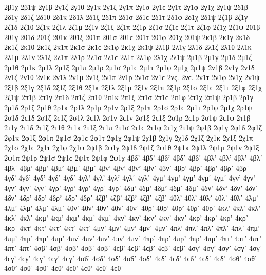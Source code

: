 {2β1χ 
2β1ψ 
%
2γ1β 
2γ1ζ 
2γ1θ 
2γ1κ 
2γ1ξ 
2γ1π 
2γ1σ 2γ1ϲ 
2γ1τ 
2γ1φ 
2γ1χ 
2γ1ψ 
%
2δ1β 
2δ1γ 
2δ1ζ 
2δ1θ 
2δ1κ 
2δ1λ 
2δ1ξ 
2δ1π 
2δ1σ 2δ1ϲ 
2δ1τ 
2δ1φ 
2δ1χ 
2δ1ψ 
%
2ζ1β   %
2ζ1γ 
2ζ1δ 
2ζ1θ 
2ζ1κ 
2ζ1λ 
2ζ1μ 
2ζ1ν 
2ζ1ξ 
2ζ1π 
2ζ1ρ 
2ζ1σ 2ζ1ϲ 
2ζ1τ 
2ζ1φ 
2ζ1χ 
2ζ1ψ 
%
2θ1β 
2θ1γ 
2θ1δ 
2θ1ζ 
2θ1κ 
2θ1ξ 
2θ1π 
2θ1σ 2θ1ϲ 
2θ1τ 
2θ1φ 
2θ1χ 
2θ1ψ 
%
2κ1β 
2κ1γ 
2κ1δ 
2κ1ζ 
2κ1θ 
2κ1ξ 
2κ1π 
2κ1σ 2κ1ϲ 
2κ1φ 
2κ1χ 
2κ1ψ 
%
2λ1β 
2λ1γ 
2λ1δ 
2λ1ζ 
2λ1θ 
2λ1κ 
2λ1μ 
2λ1ν 
2λ1ξ 
2λ1π 
2λ1ρ 
2λ1σ 2λ1ϲ 
2λ1τ 
2λ1φ 
2λ1χ 
2λ1ψ 
%
2μ1β 
2μ1γ 
2μ1δ 
2μ1ζ 
2μ1θ 
2μ1κ 
2μ1λ 
2μ1ξ 
2μ1π 
2μ1ρ 
2μ1σ 2μ1ϲ 
2μ1τ 
2μ1φ 
2μ1χ 
2μ1ψ 
%
2ν1β 
2ν1γ 
2ν1δ 
2ν1ζ 
2ν1θ 
2ν1κ 
2ν1λ 
2ν1μ 
2ν1ξ 
2ν1π 
2ν1ρ 
2ν1σ 2ν1ϲ 
2νς. 2νϲ. 
2ν1τ 
2ν1φ 
2ν1χ 
2ν1ψ 
%
2ξ1β 
2ξ1γ 
2ξ1δ 
2ξ1ζ 
2ξ1θ 
2ξ1κ 
2ξ1λ 
2ξ1μ 
2ξ1ν 
2ξ1π 
2ξ1ρ 
2ξ1σ 2ξ1ϲ 
2ξ1τ 
2ξ1φ 
2ξ1χ 
2ξ1ψ 
%
2π1β 
2π1γ 
2π1δ 
2π1ζ 
2π1θ 
2π1κ 
2π1ξ 
2π1σ 2π1ϲ 
2π1φ 
2π1χ 
2π1ψ 
%
2ρ1β 
2ρ1γ 
2ρ1δ 
2ρ1ζ 
2ρ1θ 
2ρ1κ 
2ρ1λ 
2ρ1μ 
2ρ1ν 
2ρ1ξ 
2ρ1π 
2ρ1σ 2ρ1ϲ 
2ρ1τ 
2ρ1φ 
2ρ1χ 
2ρ1ψ 
%
2σ1δ 2ϲ1δ   %
2σ1ζ 2ϲ1ζ 
2σ1λ 2ϲ1λ 
2σ1ν 2ϲ1ν 
2σ1ξ 2ϲ1ξ 
2σ1ρ 2ϲ1ρ 
2σ1ψ 2ϲ1ψ 
%
2τ1β 
2τ1γ 
2τ1δ 
2τ1ζ 
2τ1θ 
2τ1κ 
2τ1ξ 
2τ1π 
2τ1σ 2τ1ϲ 
2τ1φ 
2τ1χ 
2τ1ψ 
%
2φ1β 
2φ1γ 
2φ1δ 
2φ1ζ 
2φ1κ 
2φ1ξ 
2φ1π 
2φ1σ 2φ1ϲ 
2φ1τ 
2φ1χ 
2φ1ψ 
%
2χ1β 
2χ1γ 
2χ1δ 
2χ1ζ 
2χ1κ 
2χ1ξ 
2χ1π 
2χ1σ 2χ1ϲ 
2χ1τ 
2χ1φ 
2χ1ψ 
%
2ψ1β 
2ψ1γ 
2ψ1δ 
2ψ1ζ 
2ψ1θ 
2ψ1κ 
2ψ1λ 
2ψ1μ 
2ψ1ν 
2ψ1ξ 
2ψ1π 
2ψ1ρ 
2ψ1σ 2ψ1ϲ 
2ψ1τ 
2ψ1φ 
2ψ1χ 
4βδ' 4βδ’ 4βδʼ 4βδ᾽ 4βδ᾿ 
4βλ' 4βλ’ 4βλʼ 4βλ᾽ 4βλ᾿ 
4βμ' 4βμ’ 4βμʼ 4βμ᾽ 4βμ᾿ 
4βν' 4βν’ 4βνʼ 4βν᾽ 4βν᾿ 
4βρ' 4βρ’ 4βρʼ 4βρ᾽ 4βρ᾿ 
%
4γδ' 4γδ’ 4γδʼ 4γδ᾽ 4γδ᾿ 
4γλ' 4γλ’ 4γλʼ 4γλ᾽ 4γλ᾿ 
4γμ' 4γμ’ 4γμʼ 4γμ᾽ 4γμ᾿ 
4γν' 4γν’ 4γνʼ 4γν᾽ 4γν᾿ 
4γρ' 4γρ’ 4γρʼ 4γρ᾽ 4γρ᾿ 
%
4δμ' 4δμ’ 4δμʼ 4δμ᾽ 4δμ᾿ 
4δν' 4δν’ 4δνʼ 4δν᾽ 4δν᾿ 
4δρ' 4δρ’ 4δρʼ 4δρ᾽ 4δρ᾿ 
%
4ζβ' 4ζβ’ 4ζβʼ 4ζβ᾽ 4ζβ᾿ 
%
4θλ' 4θλ’ 4θλʼ 4θλ᾽ 4θλ᾿ 
4λμ' 4λμ’ 4λμʼ 4λμ᾽ 4λμ᾿ 
4θν' 4θν’ 4θνʼ 4θν᾽ 4θν᾿ 
4θρ' 4θρ’ 4θρʼ 4θρ᾽ 4θρ᾿ 
%
4κλ' 4κλ’ 4κλʼ 4κλ᾽ 4κλ᾿ 
4κμ' 4κμ’ 4κμʼ 4κμ᾽ 4κμ᾿ 
4κν' 4κν’ 4κνʼ 4κν᾽ 4κν᾿ 
4κρ' 4κρ’ 4κρʼ 4κρ᾽ 4κρ᾿ 
4κτ' 4κτ’ 4κτʼ 4κτ᾽ 4κτ᾿ 
%
4μν' 4μν’ 4μνʼ 4μν᾽ 4μν᾿ 
%
4πλ' 4πλ’ 4πλʼ 4πλ᾽ 4πλ᾿ 
4πμ' 4πμ’ 4πμʼ 4πμ᾽ 4πμ᾿ 
4πν' 4πν’ 4πνʼ 4πν᾽ 4πν᾿ 
4πρ' 4πρ’ 4πρʼ 4πρ᾽ 4πρ᾿ 
4πτ' 4πτ’ 4πτʼ 4πτ᾽ 4πτ᾿ 
%
4σβ' 4σβ’ 4σβʼ 4σβ᾽ 4σβ᾿ 4ϲβ' 4ϲβ’ 4ϲβʼ 4ϲβ᾽ 4ϲβ᾿ 
4σγ' 4σγ’ 4σγʼ 4σγ᾽ 4σγ᾿ 4ϲγ' 4ϲγ’ 4ϲγʼ 4ϲγ᾽ 4ϲγ᾿ 
4σδ' 4σδ’ 4σδʼ 4σδ᾽ 4σδ᾿ 4ϲδ' 4ϲδ’ 4ϲδʼ 4ϲδ᾽ 4ϲδ᾿ 
4σθ' 4σθ’ 4σθʼ 4σθ᾽ 4σθ᾿ 4ϲθ' 4ϲθ’ 4ϲθʼ 4ϲθ᾽ 4ϲθ᾿ 
}
